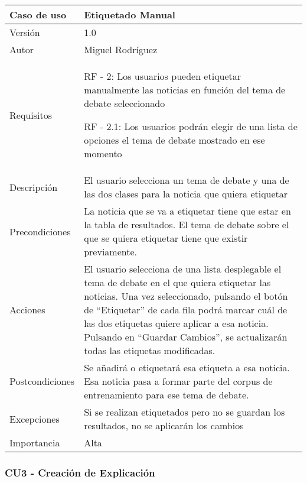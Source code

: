 \begin{center}
\begin{tabular}{ | m{3cm} | m{10cm}| } 
\hline
Caso de uso & Etiquetado Manual \\
\hline
Versión & 1.0 \\  
\hline
Autor & Miguel Rodríguez \\ 
\hline
Requisitos & RF - 2: Los usuarios pueden etiquetar manualmente las noticias en función del tema de debate seleccionado

RF - 2.1: Los usuarios podrán elegir de una lista de opciones el tema de debate mostrado en ese momento \\ 
\hline
Descripción & El usuario selecciona un tema de debate y una de las dos clases para la noticia que quiera etiquetar \\
\hline
Precondiciones & La noticia que se va a etiquetar tiene que estar en la tabla de resultados. El tema de debate sobre el que se quiera etiquetar tiene que existir previamente. \\
\hline
Acciones & El usuario selecciona de una lista desplegable el tema de debate en el que quiera etiquetar las noticias. Una vez seleccionado, pulsando el botón de ``Etiquetar'' de cada fila podrá marcar cuál de las dos etiquetas quiere aplicar a esa noticia. Pulsando en ``Guardar Cambios'', se actualizarán todas las etiquetas modificadas. \\
\hline
Postcondiciones & Se añadirá o etiquetará esa etiqueta a esa noticia. Esa noticia pasa a formar parte del corpus de entrenamiento para ese tema de debate. \\
\hline
Excepciones & Si se realizan etiquetados pero no se guardan los resultados, no se aplicarán los cambios \\
\hline 
Importancia & Alta \\
\hline 
\end{tabular}
\end{center}

\clearpage
\subsubsection{CU3 - Creación de Explicación}

